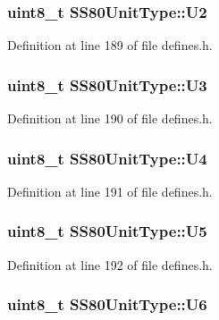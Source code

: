\subsubsection[{\texorpdfstring{U2}{U2}}]{\setlength{\rightskip}{0pt plus 5cm}uint8\+\_\+t S\+S80\+Unit\+Type\+::\+U2}\hypertarget{structSS80UnitType_a0f8959345241baa6f0fb5b17bf15d9e6}{}\label{structSS80UnitType_a0f8959345241baa6f0fb5b17bf15d9e6}


Definition at line 189 of file defines.\+h.

\subsubsection[{\texorpdfstring{U3}{U3}}]{\setlength{\rightskip}{0pt plus 5cm}uint8\+\_\+t S\+S80\+Unit\+Type\+::\+U3}\hypertarget{structSS80UnitType_a0dd8387c09ade023e9fc2bcde07fb4b1}{}\label{structSS80UnitType_a0dd8387c09ade023e9fc2bcde07fb4b1}


Definition at line 190 of file defines.\+h.

\subsubsection[{\texorpdfstring{U4}{U4}}]{\setlength{\rightskip}{0pt plus 5cm}uint8\+\_\+t S\+S80\+Unit\+Type\+::\+U4}\hypertarget{structSS80UnitType_ae7248c3b6cdf02493c0be621f8f9a93f}{}\label{structSS80UnitType_ae7248c3b6cdf02493c0be621f8f9a93f}


Definition at line 191 of file defines.\+h.

\subsubsection[{\texorpdfstring{U5}{U5}}]{\setlength{\rightskip}{0pt plus 5cm}uint8\+\_\+t S\+S80\+Unit\+Type\+::\+U5}\hypertarget{structSS80UnitType_a8c9860252085e8de68f08d5148428832}{}\label{structSS80UnitType_a8c9860252085e8de68f08d5148428832}


Definition at line 192 of file defines.\+h.

\subsubsection[{\texorpdfstring{U6}{U6}}]{\setlength{\rightskip}{0pt plus 5cm}uint8\+\_\+t S\+S80\+Unit\+Type\+::\+U6}\hypertarget{structSS80UnitType_a04fb8175375dd46cd891596756196584}{}\label{structSS80UnitType_a04fb8175375dd46cd891596756196584}


